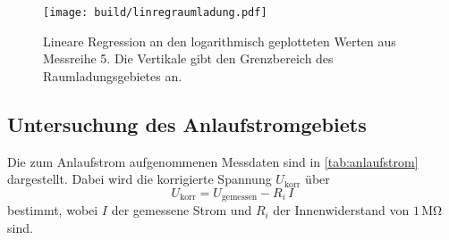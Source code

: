 \begin{figure}[H]
    \centering
    \texttt{[image: build/linregraumladung.pdf]}
    \caption{Lineare Regression an den logarithmisch geplotteten Werten aus Messreihe 5. Die Vertikale gibt den Grenzbereich des Raumladungsgebietes an.}
    \label{fig:linregkennl5}
\end{figure}


\subsection{Untersuchung des Anlaufstromgebiets}

Die zum Anlaufstrom aufgenommenen Messdaten sind in \autoref{tab:anlaufstrom} dargestellt.
Dabei wird die korrigierte Spannung $U_\text{korr}$ über
\begin{equation*}
    U_\text{korr} = U_\text{gemessen} - R_i \, I
\end{equation*} 
bestimmt, wobei $I$ der gemessene Strom und $R_i$ der Innenwiderstand von $1 \,\unit{\mega\ohm}$ sind.

